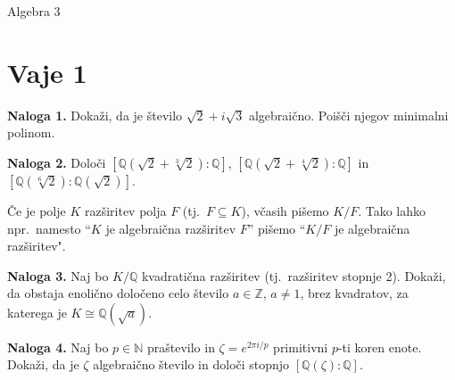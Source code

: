 \documentclass[12pt, a4paper]{article}
\begin{document}
\Huge
\begin{center}
    Algebra 3 \\    
\end{center}
\normalsize
\section*{Vaje 1}

\textbf{Naloga 1.}
Dokaži, da je število $\sqrt{2} + i\sqrt{3}$ algebraično. Poišči njegov minimalni polinom.

\textbf{Naloga 2.}
Določi $[\mathbb{Q}(\sqrt{2} + \sqrt[3]{2}) : \mathbb{Q}]$, 
$[\mathbb{Q}(\sqrt{2} + \sqrt[4]{2}) : \mathbb{Q}]$ in 
$[\mathbb{Q}(\sqrt[6]{2}) : \mathbb{Q}(\sqrt{2})]$.

Če je polje $K$ razširitev polja $F$ (tj.~$F \subseteq K$), včasih pišemo $K/F$. 
Tako lahko npr.~namesto ``$K$ je algebraična razširitev $F$'' 
pišemo ``$K/F$ je algebraična razširitev".

\textbf{Naloga 3.}
Naj bo $K/\mathbb{Q}$ kvadratična razširitev (tj.~razširitev stopnje 2). 
Dokaži, da obstaja enolično določeno celo število $a \in \mathbb{Z}$, 
$a \neq 1$, brez kvadratov, za katerega je $K \cong \mathbb{Q}(\sqrt{a})$.

\textbf{Naloga 4.}
Naj bo $p \in \mathbb{N}$ praštevilo in $\zeta = e^{2\pi i / p}$ 
primitivni $p$-ti koren enote. Dokaži, da je $\zeta$ algebraično število
in določi stopnjo $[\mathbb{Q}(\zeta) : \mathbb{Q}]$.
\end{document}
